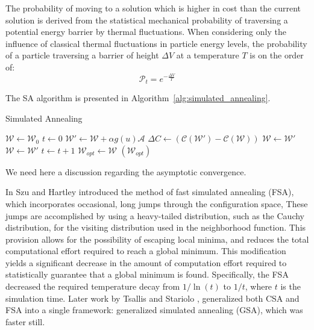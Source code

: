 \documentclass[11pt]{afthesis}
\begin{document}
	
	The probability of moving to a solution which is higher in cost than the current solution is derived from the statistical mechanical probability of traversing a potential energy barrier by thermal fluctuations. When considering only the influence of classical thermal fluctuations in particle energy levels, the probability of a particle traversing a barrier of height \begin{math} \Delta V \end{math} at a temperature \begin{math} T \end{math} is on the order of: \begin{equation} 
	\mathcal{P}_t = e^{-\frac{\Delta V}{T}} 
	\end{equation}
	
	 The SA algorithm is presented in Algorithm~\ref{alg:simulated_annealing}. 



	
	\begin{algorithm}
		\caption{Simulated Annealing}
		\label{alg:simulated_annealing}
		\begin{algorithmic}
			\STATE $\boldsymbol{\mathcal{W}} \leftarrow \boldsymbol{\mathcal{W}}_0$
			\STATE $t \leftarrow 0$
			\STATE $\boldsymbol{\mathcal{W}}' \leftarrow \boldsymbol{\mathcal{W}} + \alpha g(u) \boldsymbol{\mathcal{A}} $
			\STATE $\Delta C \leftarrow (\mathcal{C}(\boldsymbol{\mathcal{W}}')-\mathcal{C}(\boldsymbol{\mathcal{W}}))$
			\STATE $\boldsymbol{\mathcal{W}} \leftarrow \boldsymbol{\mathcal{W}}'$
			\STATE $\boldsymbol{\mathcal{W}} \leftarrow \boldsymbol{\mathcal{W}}'$
			\ENDIF
			\STATE $t \leftarrow t+1$
			\ENDWHILE
			\STATE $\boldsymbol{\mathcal{W}}_{opt} \leftarrow \boldsymbol{\mathcal{W}}$
			\RETURN $(\boldsymbol{\mathcal{W}}_{opt})$
		\end{algorithmic}
	\end{algorithm}
		
	We need here a discussion regarding the asymptotic convergence.
	
	In \cite{szu1987fastsimulatedannealing} Szu and Hartley introduced the method of fast simulated annealing (FSA), which incorporates occasional, long jumps through the configuration space, These jumps are accomplished by using a heavy-tailed distribution, such as the Cauchy distribution, for the visiting distribution used in the neighborhood function. This provision allows for the possibility of escaping local minima, and reduces the total computational effort required to reach a global minimum. This modification yields a significant decrease in the amount of computation effort required to statistically guarantee that a global minimum is found. Specifically, the FSA decreased the required temperature decay from $1/\ln(t)$ to $1/t$, where $t$ is the simulation time. Later work by Tsallis and Stariolo \cite{tsallis1996generalizedsimulatedannealing}, generalized both CSA and FSA into a single framework: generalized simulated annealing (GSA), which was faster still.
	
\end{document}
